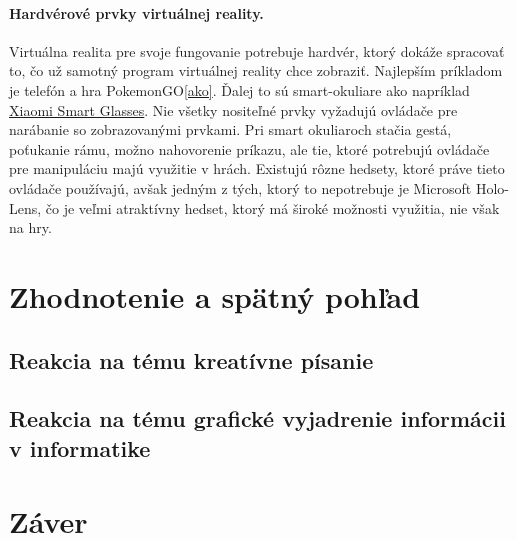 \documentclass[10pt,twoside,a4paper]{article}
\begin{document}
\paragraph{Hardvérové prvky virtuálnej reality.}
Virtuálna realita pre svoje fungovanie potrebuje hardvér, ktorý dokáže spracovať to, čo už samotný program virtuálnej reality chce zobraziť. Najlepším príkladom je telefón a hra PokemonGO\ref{ako}. Ďalej to sú smart-okuliare ako napríklad \href{https://www.mi.com/global/discover/search?key=SMART%20GLASSES}{Xiaomi Smart Glasses}. Nie všetky nositeľné prvky vyžadujú ovládače pre narábanie so zobrazovanými prvkami. Pri smart okuliaroch stačia gestá, poťukanie rámu, možno nahovorenie príkazu, ale tie, ktoré potrebujú ovládače pre manipuláciu majú využitie v hrách. Existujú rôzne hedsety, ktoré práve tieto ovládače používajú, avšak jedným z tých, ktorý to nepotrebuje je Microsoft Holo-Lens, čo je veľmi atraktívny hedset, ktorý má široké možnosti využitia, nie však na hry.

\section{Zhodnotenie a spätný pohľad} \label{konec}


\subsection{Reakcia na tému kreatívne písanie}


\subsection{Reakcia na tému grafické vyjadrenie informácii v informatike}


\section{Záver} \label{zaver} %






\end{document}
